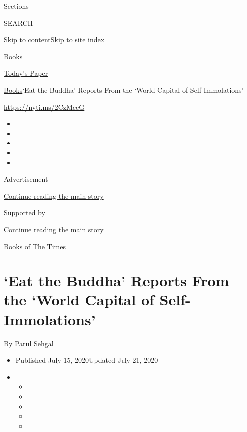 Sections

SEARCH

\protect\hyperlink{site-content}{Skip to
content}\protect\hyperlink{site-index}{Skip to site index}

\href{https://www.nytimes3xbfgragh.onion/section/books}{Books}

\href{https://myaccount.nytimes3xbfgragh.onion/auth/login?response_type=cookie\&client_id=vi}{}

\href{https://www.nytimes3xbfgragh.onion/section/todayspaper}{Today's
Paper}

\href{/section/books}{Books}\textbar{}`Eat the Buddha' Reports From the
`World Capital of Self-Immolations'

\href{https://nyti.ms/2CzMccG}{https://nyti.ms/2CzMccG}

\begin{itemize}
\item
\item
\item
\item
\item
\end{itemize}

Advertisement

\protect\hyperlink{after-top}{Continue reading the main story}

Supported by

\protect\hyperlink{after-sponsor}{Continue reading the main story}

\href{/column/books-of-the-times}{Books of The Times}

\hypertarget{eat-the-buddha-reports-from-the-world-capital-of-self-immolations}{%
\section{`Eat the Buddha' Reports From the `World Capital of
Self-Immolations'}\label{eat-the-buddha-reports-from-the-world-capital-of-self-immolations}}

By \href{https://www.nytimes3xbfgragh.onion/by/parul-sehgal}{Parul
Sehgal}

\begin{itemize}
\item
  Published July 15, 2020Updated July 21, 2020
\item
  \begin{itemize}
  \item
  \item
  \item
  \item
  \item
  \end{itemize}
\end{itemize}

